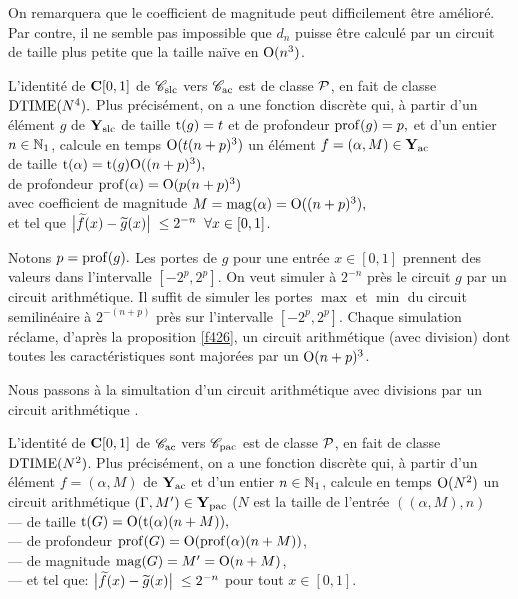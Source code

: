 \smallskip On remarquera que le coefficient de magnitude peut difficilement être amélioré. Par contre, il ne semble pas impossible que $ d_n$ puisse être calculé par un circuit de taille plus petite que la taille naïve en ${\rm O}(n^3)$.

\begin{fproposition} \label{f427}
L'identité de  ${{\bf C}[0,1]}$  de  ${{{\mathscr C}}_{\rm slc}}$  vers  ${{{\mathscr C}}_{\rm ac}}$  est \uni de classe  ${\cal P}$, en fait de classe $ {\rm DTIME} (N^4). $ 
Plus précisément, on a une fonction discrète qui, à partir d'un élément $ g $ de $ {{\bf Y}_{\rm slc}} $ de taille $ {\rm t}(g) = t $ et de profondeur $ {\rm prof}(g) = p, $ et d'un entier $ n \in  \mathbb {N}_1$,  calcule en temps $ {\rm O}( t (n+p)^3 ) $ un élément $ f = (\alpha,M)  \in {{\bf Y}_{\rm ac}}$\\ 
\spa de taille	 $ {\rm t}(\alpha)  =  {\rm t}(g) {\rm O}((n+p)^3), $  \\
\spa de profondeur	 $ {\rm prof}(\alpha)  = {\rm O}(p(n+p)^3) $ \\
\spa avec coefficient de magnitude	 $ M = {\rm mag}(\alpha) = {\rm O}((n+p)^3), $  
\\
et tel que 	
$\big|{\widetilde{f}(x)-\widetilde{g}(x)}\big|\; \leq 2^{-n} \; \; \forall x \in [0,1]$. 
\end{fproposition} 

\proof 
Notons   $ p = {\rm prof}(g). $   Les portes de $ g $ pour une entrée 
$ x \in  [0,1]$    prennent des valeurs dans l'intervalle $[-2^p,2^p]$.  
On veut simuler à  $2^{-n}$  près le circuit $ g $ par un circuit 
arithmétique.  Il suffit de simuler les portes $\max$ et $\min$ du circuit 
semilinéaire à $2^{-(n+p)}$ près sur l'intervalle $[-2^p,2^p]$.  
Chaque simulation réclame, d'après la proposition \ref{f426}, un circuit 
arithmétique (avec division) dont toutes les caractéristiques sont 
majorées par un  ${\rm O}(n+p)^3$.	\eop

Nous passons à la simultation d'un circuit arithmétique avec divisions par 
un circuit arithmétique \poll.

\begin{fproposition} \label{f428}
L'identité de  ${{\bf C}[0,1]}$  de  ${{{\mathscr C}}_{\rm ac}}$  vers  ${{{\mathscr C}}_{\rm pac}}$  est \uni de classe  ${\cal P}$, en 
fait de classe  ${\rm DTIME} (N^2)$.  
Plus précisément, on a une fonction discrète qui, à partir d'un 
élément  $f=(\alpha,M)$ de  ${{\bf Y}_{\rm ac}}$ et d'un entier  
$n\in\mathbb {N}_1$,  calcule en temps  ${\rm O}(N^2)$  un circuit arithmétique 
\poll   $(\Gamma, M') \in {{\bf Y}_{\rm pac}} $ ($N$ est la taille de l'entrée 
$((\alpha,M),n)$ \\
--- de taille  $ {\rm t}(G) = {\rm O}( {\rm t}(\alpha) (n + M) ), $  \\
--- de profondeur  $ {\rm prof}(G) = {\rm O}( {\rm prof}(\alpha) (n + M) ) $, \\
--- de magnitude  $ {\rm mag}(G) = M'= {\rm O}( n + M ) $,  \\
--- et tel que:  
$\big|{ \widetilde{f}(x) - \widetilde{g}(x) }\big|\;  \leq 2^{-n}$  
pour tout $x \in [0,1]$.
\end{fproposition}
 
